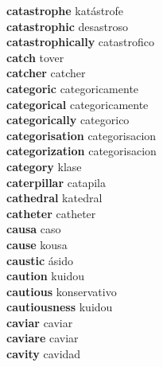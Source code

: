 \textbf{catastrophe } katástrofe \\
\textbf{catastrophic } desastroso \\
\textbf{catastrophically } catastrofico \\
\textbf{catch } tover \\
\textbf{catcher } catcher \\
\textbf{categoric } categoricamente \\
\textbf{categorical } categoricamente \\
\textbf{categorically } categorico \\
\textbf{categorisation } categorisacion \\
\textbf{categorization } categorisacion \\
\textbf{category } klase \\
\textbf{caterpillar } catapila \\
\textbf{cathedral } katedral \\
\textbf{catheter } catheter \\
\textbf{causa } caso \\
\textbf{cause } kousa \\
\textbf{caustic } ásido \\
\textbf{caution } kuidou \\
\textbf{cautious } konservativo \\
\textbf{cautiousness } kuidou \\
\textbf{caviar } caviar \\
\textbf{caviare } caviar \\
\textbf{cavity } cavidad \\
